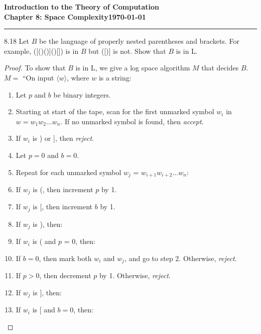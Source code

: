 \documentclass[11pt]{article}
\newcommand{\dated}{\today}
\begin{document}
\textbf{Introduction to the Theory of
Computation}\hfill\textbf{\myname}\\[0.01in]
\textbf{Chapter 8: Space Complexity}\hfill\textbf{\dated}\\
\smallskip\hrule\bigskip

\begin{problem}{8.18}
Let $B$ be the language of properly nested parentheses and brackets. For example, ([()()]()[]) is in $B$ but ([)] is not. Show that $B$ is in L.
\end{problem}

\begin{proof}
To show that $B$ is in L, we give a log space algorithm $M$ that decides $B$. \\

$M =$ \textquotedblleft On input $\langle w \rangle$, where $w$ is a string:
\begin{enumerate}
\item Let $p$ and $b$ be binary integers.
\item Starting at start of the tape, scan for the first unmarked symbol $w_i$ in $w = w_1 w_2 \ldots w_n$. If no unmarked symbol is found, then \textit{accept}.
\item If $w_i$ is ) or ], then \textit{reject}.
\item Let $p = 0$ and $b = 0$.
\item Repeat for each unmarked symbol $w_j$ = $w_{i+1}w_{i+2} \ldots w_n$:
\item \hspace*{0.5cm} If $w_j$ is (, then increment $p$ by 1.
\item \hspace*{0.5cm} If $w_j$ is [, then increment $b$ by 1.
\item \hspace*{0.5cm} If $w_j$ is ), then:
\item \hspace*{1.0cm} If $w_i$ is ( and $p$ = 0, then:
\item \hspace*{1.5cm} If $b = 0$, then mark both $w_i$ and $w_j$, and go to step 2. Otherwise, \textit{reject}.
\item \hspace*{1.0cm} If $p > 0$, then decrement $p$ by 1. Otherwise, \textit{reject}.
\item \hspace*{0.5cm} If $w_j$ is ], then:
\item \hspace*{1.0cm} If $w_i$ is [ and $b = 0$, then:

\end{enumerate}
\end{proof}
\end{document}
